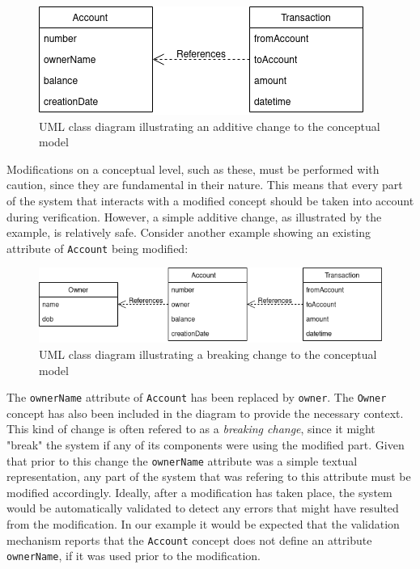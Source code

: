 \begin{figure}[H]\centering
    \includegraphics[scale=0.65]{images/banking1.drawio.png}
    \caption{UML class diagram illustrating an additive change to the conceptual model}\label{fig:bank1}
\end{figure}

\n

Modifications on a conceptual level, such as these, must be performed with caution, since they are fundamental in their nature.
This means that every part of the system that interacts with a modified concept should be taken into account during verification.
However, a simple additive change, as illustrated by the example, is relatively safe.
Consider another example showing an existing attribute of \texttt{Account} being modified:

\begin{figure}[H]\centering
    \includegraphics[scale=0.65]{images/banking2.drawio.png}
    \caption{UML class diagram illustrating a breaking change to the conceptual model}\label{fig:bank2}
\end{figure}

The \texttt{ownerName} attribute of \texttt{Account} has been replaced by \texttt{owner}.
The \texttt{Owner} concept has also been included in the diagram to provide the necessary context.
This kind of change is often refered to as a \textit{breaking change}, since it might "break" the system if any of its components were using the modified part.
Given that prior to this change the \texttt{ownerName} attribute was a simple textual representation, any part of the system that was refering to this attribute must be modified accordingly.
Ideally, after a modification has taken place, the system would be automatically validated to detect any errors that might have resulted from the modification.
In our example it would be expected that the validation mechanism reports that the \texttt{Account} concept does not define an attribute \texttt{ownerName}, if it was used prior to the modification.

